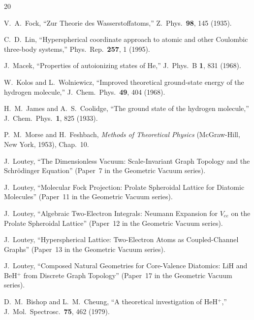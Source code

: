 \documentclass[aps,pra,twocolumn,superscriptaddress,longbibliography]{revtex4-2}
\begin{document}
\begin{thebibliography}{20}

V.~A.~Fock,
``Zur Theorie des Wasserstoffatoms,''
Z.~Phys.\ \textbf{98}, 145 (1935).

C.~D.~Lin,
``Hyperspherical coordinate approach to atomic and other
Coulombic three-body systems,''
Phys.\ Rep.\ \textbf{257}, 1 (1995).

J.~Macek,
``Properties of autoionizing states of He,''
J.~Phys.\ B \textbf{1}, 831 (1968).

W.~Kolos and L.~Wolniewicz,
``Improved theoretical ground-state energy of the hydrogen molecule,''
J.~Chem.\ Phys.\ \textbf{49}, 404 (1968).

H.~M.~James and A.~S.~Coolidge,
``The ground state of the hydrogen molecule,''
J.~Chem.\ Phys.\ \textbf{1}, 825 (1933).

P.~M.~Morse and H.~Feshbach,
\emph{Methods of Theoretical Physics}
(McGraw-Hill, New York, 1953), Chap.~10.

J.~Loutey,
``The Dimensionless Vacuum: Scale-Invariant Graph Topology
and the Schr\"odinger Equation'' (Paper~7 in the Geometric Vacuum series).

J.~Loutey,
``Molecular Fock Projection: Prolate Spheroidal Lattice
for Diatomic Molecules'' (Paper~11 in the Geometric Vacuum series).

J.~Loutey,
``Algebraic Two-Electron Integrals: Neumann Expansion
for $V_{ee}$ on the Prolate Spheroidal Lattice''
(Paper~12 in the Geometric Vacuum series).

J.~Loutey,
``Hyperspherical Lattice: Two-Electron Atoms as
Coupled-Channel Graphs'' (Paper~13 in the Geometric Vacuum series).

J.~Loutey,
``Composed Natural Geometries for Core-Valence Diatomics:
LiH and BeH$^+$ from Discrete Graph Topology''
(Paper~17 in the Geometric Vacuum series).

D.~M.~Bishop and L.~M.~Cheung,
``A theoretical investigation of HeH$^+$,''
J.~Mol.\ Spectrosc.\ \textbf{75}, 462 (1979).

\end{thebibliography}
\end{document}

